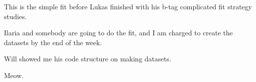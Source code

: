 
This is the simple fit before Lukas finished with his b-tag complicated fit strategy studies.

Ilaria and somebody are going to do the fit, and I am charged to create the datasets by the end of the week.

Will showed me his code structure on making datasets.



Meow.


